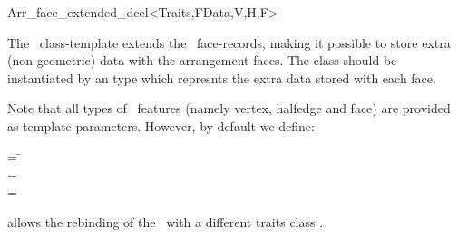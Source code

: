 
\ccRefPageBegin

\begin{ccRefClass}{Arr_face_extended_dcel<Traits,FData,V,H,F>}

\ccDefinition

The \ccRefName\ class-template extends the \dcel\ face-records, making it
possible to store extra (non-geometric) data with the arrangement faces.
The class should be instantiated by an  type which represnts the
extra data stored with each face. 

Note that all types of \dcel\ features (namely vertex, halfedge and face)
are provided as template parameters. However, by default we define:

\begin{tabbing}
 = \=\\
 = \>\\
 = \>
\end{tabbing}


\ccIsModel

\ccInheritsFrom

\ccTypes

  {allows the rebinding of the \dcel\ with a different traits class .}

\ccSeeAlso


\end{ccRefClass}

\ccRefPageEnd
